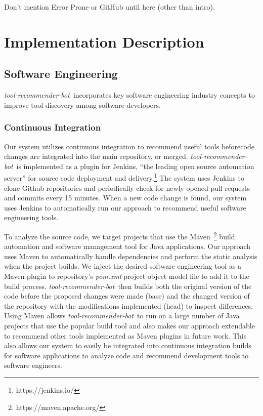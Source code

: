\documentclass[sigconf,review,anonymous]{acmart}
\newcommand{\tool}{\textsl{tool-recommender-bot}}
\begin{document}
Don't mention Error Prone or GitHub until here (other than intro).

\section{Implementation Description}

\subsection{Software Engineering}

\tool~incorporates key software engineering industry concepts to improve tool discovery among software developers.

\subsubsection{Continuous Integration}

Our system utilizes continuous integration to recommend useful tools beforecode changes are integrated into the main repository, or merged. \tool~is implemented as a plugin for Jenkins, ``the leading open source automation server'' for source code deployment and delivery.\footnote{https://jenkins.io/} The system uses Jenkins to clone Github repositories and periodically check for newly-opened pull requests and commits every 15 minutes. When a new code change is found, our system uses Jenkins to automatically run our approach to recommend useful software engineering tools.

To analyze the source code, we target projects that use the Maven~\footnote{https://maven.apache.org/} build automation and software management tool for Java applications. Our approach uses Maven to automatically handle dependencies and perform the static analysis when the project builds. We inject the desired software engineering tool as a Maven plugin to repository's \textit{pom.xml} project object model file to add it to the build process. \tool~then builds both the original version of the code before the proposed changes were made (base) and the changed version of the repository with the modifications implemented (head) to inspect differences. Using Maven allows \tool~to run on a large number of Java projects that use the popular build tool and also makes our approach extendable to recommend other tools implemented as Maven plugins in future work. This also allows our system to easily be integrated into continuous integration builds for software applications to analyze code and recommend development tools to software engineers.
\end{document}
